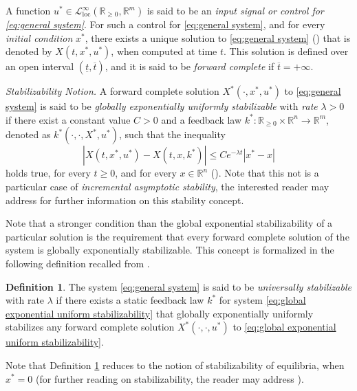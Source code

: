 \documentclass[10pt,twocolumn,twoside]{IEEEtran}
\theoremstyle{plain}
\theoremstyle{definition}
\newtheorem{definition}[theorem]{Definition}
\theoremstyle{remark}
\begin{document}
A function $u^\ast\in\mathcal{L}_{\mathrm{loc}}^\infty(\mathbb{R}_{\geq0},\mathbb{R}^m)$ is said to be an \emph{input signal or control for \eqref{eq:general system}}. For such a control for \eqref{eq:general system}, and for every \emph{initial condition} $x^\ast$, there exists a unique solution to \eqref{eq:general system} (\cite{Teschl2012}) that is denoted by $X(t,x^\ast,u^\ast)$, when computed at time $t$. This solution is defined over an open interval $(\underline{t},\overline{t})$, and it is said to be \emph{forward complete} if $\overline{t}=+\infty$.

{\itshape Stabilizability Notion.} A forward complete solution $X^\ast(\cdot,x^\ast,u^\ast)$ to \eqref{eq:general system} is said to be  \emph{globally exponentially uniformly stabilizable} with \emph{rate} $\lambda>0$ if there exist a constant value $C>0$ and a feedback law $k^\ast:\mathbb{R}_{\geq0}\times\mathbb{R}^n\to\mathbb{R}^m$, denoted as $k^\ast(\cdot,\cdot,X^\ast,u^\ast)$, such that the inequality
\begin{equation}\label{eq:global exponential uniform stabilizability}
	\left|X(t,x^\ast,u^\ast)-X(t,x,k^\ast)\right|\leq Ce^{-\lambda t}|x^\ast-x|
\end{equation}
holds true, for every $t\geq0$, and for every $x\in\mathbb{R}^n$ (\cite{Manchester2014a}). Note that this not is a particular case of \emph{incremental asymptotic stability}, the interested reader may address \cite{Forni2014,Forni2014a} for further information on this stability concept.

Note that a stronger condition than the global exponential stabilizability of a particular solution is the requirement that every forward complete solution of the system is globally exponentially stabilizable. This concept is formalized in the following definition recalled from \cite{Manchester2014a}.

\begin{definition}\label{def:US}
	The system \eqref{eq:general system} is said to be \emph{universally stabilizable} with rate $\lambda$ if there exists a static feedback law $k^\ast$ for system \eqref{eq:global exponential uniform stabilizability} that globally exponentially uniformly stabilizes any forward complete solution $X^\ast(\cdot,\cdot,u^\ast)$ to \eqref{eq:global exponential uniform stabilizability}.
\end{definition}

Note that Definition \ref{def:US} reduces to the notion of stabilizability of equilibria, when $x^\ast=0$ (for further reading on stabilizability, the reader may address \cite{Bacciotti:1992}).
\end{document}
